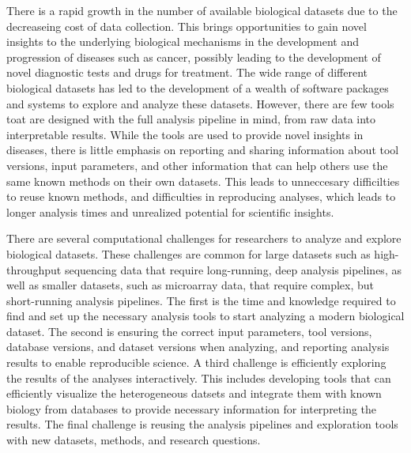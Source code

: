 There is a rapid growth in the number of available biological datasets due to
the decreaseing cost of data collection. This brings opportunities to gain novel
insights to the underlying biological mechanisms in the development and
progression of diseases such as cancer, possibly leading to the development of
novel diagnostic tests 
and drugs for treatment.  The wide range of different
biological datasets has led to the development of a wealth of software packages
and systems to explore and analyze these datasets.  However, there are few tools
toat are designed with the full analysis pipeline in mind, from raw data into
interpretable results. While the tools are used to provide novel insights in
diseases, there is little emphasis on reporting and sharing information about
tool versions, input parameters, and other information that can help others use
the same known methods on their own datasets.  This leads to unneccesary
difficilties to reuse known methods, and difficulties in reproducing analyses,
which leads to longer analysis times 
and unrealized potential for scientific
insights.

There are several 
computational challenges 
for researchers to analyze
and explore biological datasets. These challenges are common for large datasets
such as high-throughput sequencing data that require long-running, deep analysis
pipelines, as well as smaller datasets, such as microarray data, that require
complex, but short-running analysis pipelines. The first is the time and
knowledge required to find and set up the necessary analysis tools to start
analyzing a modern biological dataset. The second is ensuring the correct input
parameters, tool versions, database versions, and dataset versions when
analyzing, and reporting analysis results to enable reproducible science. A
third challenge is efficiently exploring the results of the analyses
interactively. This includes developing tools that can efficiently visualize the
heterogeneous datsets and integrate them with known biology from databases to
provide necessary information for interpreting the results. The final challenge
is reusing the analysis pipelines and exploration tools with new datasets,
methods, and research questions. 

